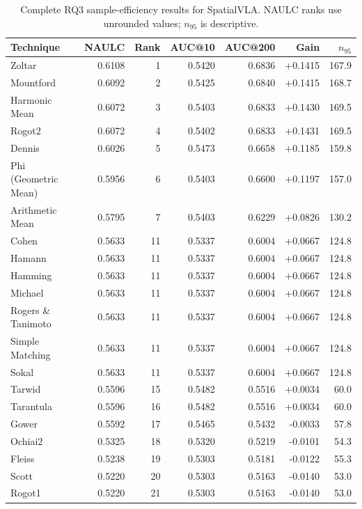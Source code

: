 \begin{table}[t]
\centering
\caption{Complete RQ3 sample-efficiency results for SpatialVLA. NAULC ranks use unrounded values; $n_{95}$ is descriptive.}
\label{tab:rq3v2-efficiency-spatialvla}
{\scriptsize
\setlength{\tabcolsep}{6pt}
\begin{tabular}{lrrrrrr}
\toprule
Technique & NAULC & Rank & AUC@10 & AUC@200 & Gain & $n_{95}$ \\
\midrule
Zoltar & 0.6108 & 1 & 0.5420 & 0.6836 & +0.1415 & 167.9 \\
Mountford & 0.6092 & 2 & 0.5425 & 0.6840 & +0.1415 & 168.7 \\
Harmonic Mean & 0.6072 & 3 & 0.5403 & 0.6833 & +0.1430 & 169.5 \\
Rogot2 & 0.6072 & 4 & 0.5402 & 0.6833 & +0.1431 & 169.5 \\
Dennis & 0.6026 & 5 & 0.5473 & 0.6658 & +0.1185 & 159.8 \\
Phi (Geometric Mean) & 0.5956 & 6 & 0.5403 & 0.6600 & +0.1197 & 157.0 \\
Arithmetic Mean & 0.5795 & 7 & 0.5403 & 0.6229 & +0.0826 & 130.2 \\
Cohen & 0.5633 & 11 & 0.5337 & 0.6004 & +0.0667 & 124.8 \\
Hamann & 0.5633 & 11 & 0.5337 & 0.6004 & +0.0667 & 124.8 \\
Hamming & 0.5633 & 11 & 0.5337 & 0.6004 & +0.0667 & 124.8 \\
Michael & 0.5633 & 11 & 0.5337 & 0.6004 & +0.0667 & 124.8 \\
Rogers \& Tanimoto & 0.5633 & 11 & 0.5337 & 0.6004 & +0.0667 & 124.8 \\
Simple Matching & 0.5633 & 11 & 0.5337 & 0.6004 & +0.0667 & 124.8 \\
Sokal & 0.5633 & 11 & 0.5337 & 0.6004 & +0.0667 & 124.8 \\
Tarwid & 0.5596 & 15 & 0.5482 & 0.5516 & +0.0034 & 60.0 \\
Tarantula & 0.5596 & 16 & 0.5482 & 0.5516 & +0.0034 & 60.0 \\
Gower & 0.5592 & 17 & 0.5465 & 0.5432 & -0.0033 & 57.8 \\
Ochiai2 & 0.5325 & 18 & 0.5320 & 0.5219 & -0.0101 & 54.3 \\
Fleiss & 0.5238 & 19 & 0.5303 & 0.5181 & -0.0122 & 55.3 \\
Scott & 0.5220 & 20 & 0.5303 & 0.5163 & -0.0140 & 53.0 \\
Rogot1 & 0.5220 & 21 & 0.5303 & 0.5163 & -0.0140 & 53.0 \\

\end{tabular}}
\end{table}
